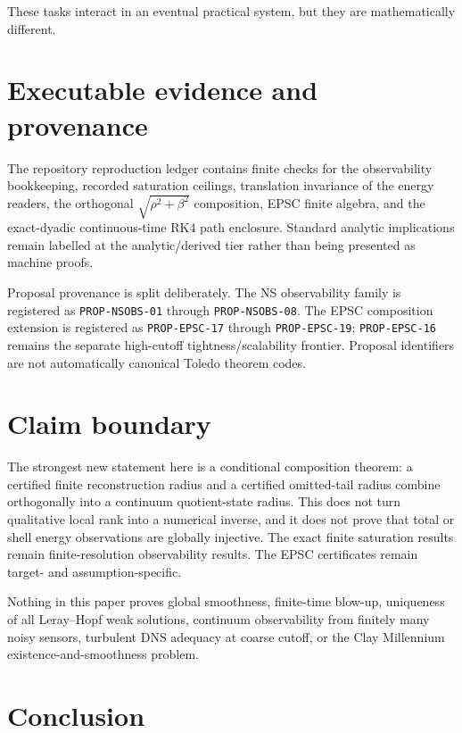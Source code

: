 \documentclass[11pt]{article}
\theoremstyle{definition}
\begin{document}
These tasks interact in an eventual practical system, but they are mathematically different.

\section{Executable evidence and provenance}

The repository reproduction ledger contains finite checks for the observability bookkeeping,
recorded saturation ceilings, translation invariance of the energy readers, the orthogonal
$\sqrt{\rho^2+\beta^2}$ composition, EPSC finite algebra, and the exact-dyadic continuous-time RK4
path enclosure.  Standard analytic implications remain labelled at the analytic/derived tier rather
than being presented as machine proofs.

Proposal provenance is split deliberately.  The NS observability family is registered as
\texttt{PROP-NSOBS-01} through \texttt{PROP-NSOBS-08}.  The EPSC composition extension is registered
as \texttt{PROP-EPSC-17} through \texttt{PROP-EPSC-19}; \texttt{PROP-EPSC-16} remains the separate
high-cutoff tightness/scalability frontier.  Proposal identifiers are not automatically canonical
Toledo theorem codes.

\section{Claim boundary}

The strongest new statement here is a conditional composition theorem: a certified finite
reconstruction radius and a certified omitted-tail radius combine orthogonally into a continuum
quotient-state radius.  This does not turn qualitative local rank into a numerical inverse, and it
does not prove that total or shell energy observations are globally injective.  The exact finite
saturation results remain finite-resolution observability results.  The EPSC certificates remain
target- and assumption-specific.

Nothing in this paper proves global smoothness, finite-time blow-up, uniqueness of all Leray--Hopf
weak solutions, continuum observability from finitely many noisy sensors, turbulent DNS adequacy at
coarse cutoff, or the Clay Millennium existence-and-smoothness problem.

\section{Conclusion}
\end{document}
